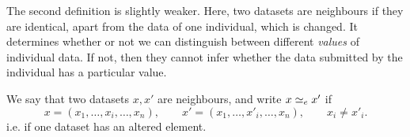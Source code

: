 \begin{frame}
{    The second definition is slightly weaker. Here, two datasets are
    neighbours if they are identical, apart from the data of one
    individual, which is changed. It determines whether or not we can
    distinguish between different \emph{values} of individual data. If
    not, then they cannot infer whether the data submitted by the
    individual has a particular value.}
  \begin{definition}
    We say that two datasets $x, x'$ are neighbours, and write $x \simeq_e x'$ if
    \[
      x = (x_1, \ldots,  x_i, \ldots, x_n),
      \qquad
      x' = (x_1, \ldots, x'_i, \ldots,  x_n),
      \qquad
      x_i \neq x'_i.
    \]
    i.e. if one dataset has an altered element.
  \end{definition}
\end{frame}



